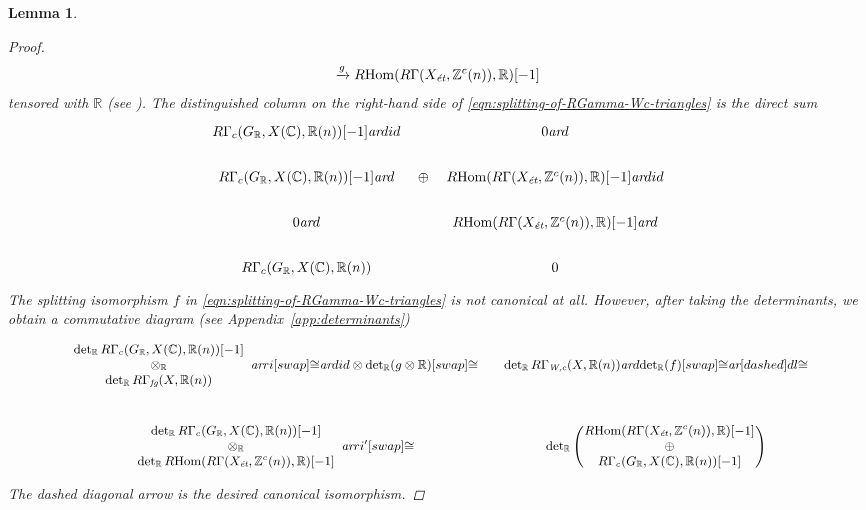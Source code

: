 \documentclass[10pt,a4paper,oneside]{article}
\DeclareMathOperator{\Hom}{Hom}
\newcommand{\CC}{\mathbb{C}}
\newcommand{\RR}{\mathbb{R}}
\newcommand{\ZZ}{\mathbb{Z}}
\renewcommand{\det}{\operatorname{det}}
\newcommand{\ar}{\text{\it ar}}
\newcommand{\et}{\text{\it \'{e}t}}
\newcommand{\fg}{\text{\it fg}}
\newcommand{\Wc}{\text{\it W,c}}
\newcommand{\RHom}{R\!\Hom}
\theoremstyle{myplain}
\newtheorem{lemma}[theorem]{Lemma}
\theoremstyle{mydefinition}
\numberwithin{equation}{section}
\begin{document}
\begin{lemma}
\begin{proof}
\begin{multline*}
      \xrightarrow{g} \RHom (R\Gamma (X_\et, \ZZ^c (n)), \RR) [-1]
    \end{multline*}
    tensored with $\RR$ (see \cite[Proposition~5.7]{Beshenov-Weil-etale-1}).
    The distinguished column on the right-hand side of
    \eqref{eqn:splitting-of-RGamma-Wc-triangles} is the direct sum
    \[ \begin{tikzcd}[row sep=1.5em]
        R\Gamma_c (G_\RR, X (\CC), \RR (n)) [-1]\ar{d}{id} &[-2em] &[-2em] 0\ar{d} \\
        R\Gamma_c (G_\RR, X (\CC), \RR (n)) [-1]\ar{d} & \oplus & \RHom (R\Gamma (X_\et, \ZZ^c (n)), \RR) [-1]\ar{d}{id} \\
        0 \ar{d} & & \RHom (R\Gamma (X_\et, \ZZ^c (n)), \RR) [-1] \ar{d} \\
        R\Gamma_c (G_\RR, X (\CC), \RR (n)) & & 0
      \end{tikzcd} \]
    The splitting isomorphism $f$ in
    \eqref{eqn:splitting-of-RGamma-Wc-triangles} is not canonical at
    all. However, after taking the determinants, we obtain a commutative diagram
    (see Appendix~\ref{app:determinants})
    \[ \begin{tikzcd}[column sep=1em, font=\small]
        \begin{array}{c} \det_\RR R\Gamma_c (G_\RR, X (\CC), \RR (n)) [-1] \\ \otimes_\RR \\ \det_\RR R\Gamma_\fg (X, \RR(n)) \end{array} \ar{r}{i}[swap]{\cong} \ar{d}{id \otimes \det_\RR (g\otimes \RR)}[swap]{\cong} & \det_\RR R\Gamma_\Wc (X, \RR (n)) \ar{d}{\det_\RR (f)}[swap]{\cong}\ar[dashed]{dl}{\cong} \\
        \begin{array}{c} \det_\RR R\Gamma_c (G_\RR, X (\CC), \RR (n)) [-1] \\ \otimes_\RR \\ \det_\RR \RHom (R\Gamma (X_\et, \ZZ^c (n)), \RR) [-1] \end{array} \ar{r}{i'}[swap]{\cong} & \det_\RR \left(\!\!\!\begin{array}{c} \RHom (R\Gamma (X_\et, \ZZ^c (n)), \RR) [-1] \\ \oplus \\ R\Gamma_c (G_\RR, X (\CC), \RR (n)) [-1] \end{array}\!\!\!\right)
      \end{tikzcd} \]
    The dashed diagonal arrow is the desired canonical isomorphism.
  \end{proof}
\end{lemma}
\end{document}
